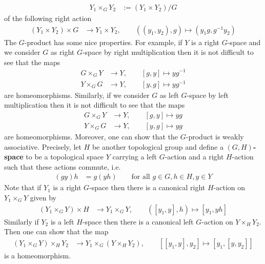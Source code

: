 \begin{align*}
  Y_{1} \times_{G} Y_{2}
  &:=
  (Y_{1} \times Y_{2})/G
\end{align*}
of the following right action
\begin{align*}
  (Y_{1} \times Y_{2})
  \times
  G
  &\to
  Y_{1} \times Y_{2}
  ,\qquad
  ((y_{1},y_{2}),g)
  \mapsto
  (y_{1}g,g^{-1}y_{2})
\end{align*}
The $G$-product has some nice properties. For example, if $Y$ is a right $G$-space and we consider $G$ as right $G$-space by right multiplication then it is not difficult to see that the maps
\begin{align*}
  G \times_{G} Y
  &\to
  Y
  ,\qquad
  [g,y]
  \mapsto
  yg^{-1}
  \\
  Y \times_{G} G
  &\to
  Y
  ,\qquad
  [y,g]
  \mapsto
  yg^{-1}
\end{align*}
are homeomorphisms. Similarly, if we consider $G$ as left $G$-space by left multiplication then it is not difficult to see that the maps
\begin{align*}
  G \times_{G} Y
  &\to
  Y
  ,\qquad
  [g,y]
  \mapsto
  yg
  \\
  Y \times_{G} G
  &\to
  Y
  ,\qquad
  [y,g]
  \mapsto
  yg
\end{align*}
are homeomorphisms. Moreover, one can show that the $G$-product is weakly associative. Precisely, let $H$ be another topological group and define a \textbf{$(G,H)$-space} to be a topological space $Y$ carrying a left $G$-action and a right $H$-action such that these actions commute, i.e.
\begin{align*}
  (gy)h
  &=
  g(yh)
  \qquad
  \text{for all }
  g
  \in
  G
  ,
  h
  \in
  H
  ,
  y
  \in
  Y
\end{align*}
Note that if $Y_{1}$ is a right $G$-space then there is a canonical right $H$-action on $Y_{1} \times_{G} Y$ given by
\begin{align*}
  (Y_{1} \times_{G} Y)
  \times
  H
  &\to
  Y_{1} \times_{G} Y
  ,\qquad
  ([y_{1},y],h)
  \mapsto
  [y_{1},yh]
\end{align*}
Similarly if $Y_{2}$ is a left $H$-space then there is a canonical left $G$-action on $Y \times_{H} Y_{2}$. Then one can show that the map
\begin{align*}
  (Y_{1} \times_{G} Y)
  \times_{H}
  Y_{2}
  &\to
  Y_{1}
  \times_{G}
  (Y \times_{H} Y_{2})
  ,\qquad
  [[y_{1},y],y_{2}]
  \mapsto
  [y_{1},[y,y_{2}]]
\end{align*}
is a homeomorphism.
\\
